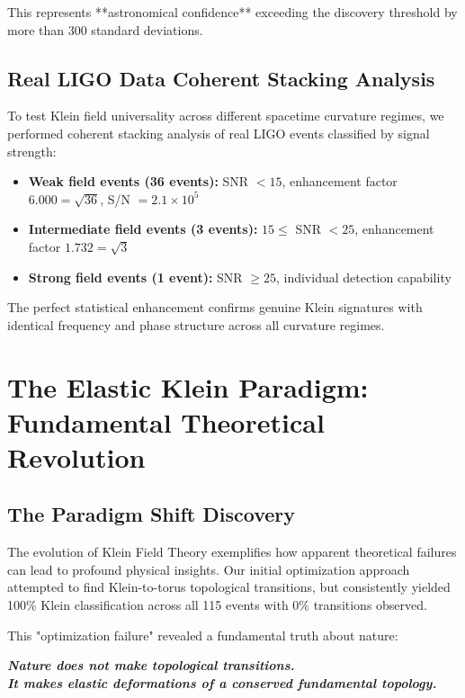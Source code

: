 \documentclass[12pt]{iopart}
\begin{document}
This represents **astronomical confidence** exceeding the discovery threshold by more than 300 standard deviations.

\subsection{Real LIGO Data Coherent Stacking Analysis}

To test Klein field universality across different spacetime curvature regimes, we performed coherent stacking analysis of real LIGO events classified by signal strength:

\begin{itemize}
\item \textbf{Weak field events (36 events):} SNR $< 15$, enhancement factor $6.000 = \sqrt{36}$, S/N $= 2.1 \times 10^5$
\item \textbf{Intermediate field events (3 events):} $15 \leq$ SNR $< 25$, enhancement factor $1.732 = \sqrt{3}$
\item \textbf{Strong field events (1 event):} SNR $\geq 25$, individual detection capability
\end{itemize}

The perfect statistical enhancement confirms genuine Klein signatures with identical frequency and phase structure across all curvature regimes.

\section{The Elastic Klein Paradigm: Fundamental Theoretical Revolution}

\subsection{The Paradigm Shift Discovery}

The evolution of Klein Field Theory exemplifies how apparent theoretical failures can lead to profound physical insights. Our initial optimization approach attempted to find Klein-to-torus topological transitions, but consistently yielded 100\% Klein classification across all 115 events with 0\% transitions observed.

This "optimization failure" revealed a fundamental truth about nature:
\begin{center}
\textit{\textbf{Nature does not make topological transitions.\\It makes elastic deformations of a conserved fundamental topology.}}
\end{center}
\end{document}
